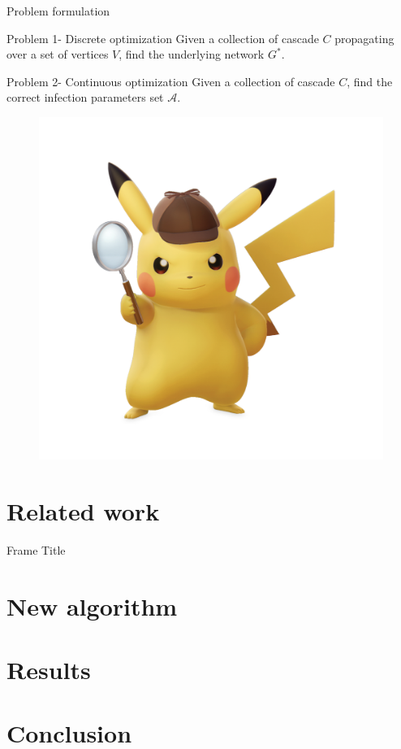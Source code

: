 \documentclass{beamer}
\begin{document}
\begin{frame}{Problem formulation}
\begin{block}{Problem 1- Discrete optimization}
Given a collection of cascade $C$ propagating over a set of vertices $V$, find the underlying network $G^*$.
\end{block}
\begin{block}{Problem 2- Continuous optimization}
Given a collection of cascade $C$, find the correct infection parameters set $\mathscr{A}$.  
\end{block}
\begin{figure}
    \centering
    \includegraphics[scale = 0.08]{Detective_Pikachu_-_Character_artwork_01.png}
\end{figure}
\end{frame}

\section{Related work}
\begin{frame}{Frame Title}
    
\end{frame}
\section{New algorithm}
\section{Results}
\section{Conclusion}
\end{document}
